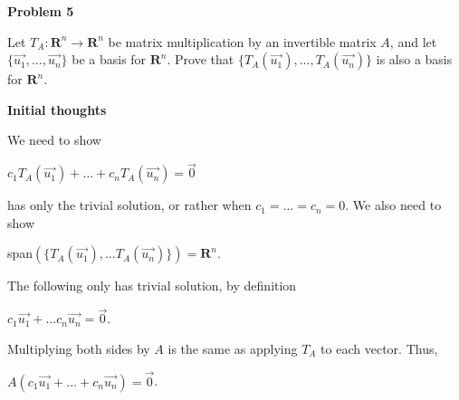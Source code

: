 \documentclass[12pt, a4paper]{article}
\begin{document}
\justifying

\textbf{Problem 5}\par

\vspace{4mm}

    Let $T_A\colon\mathbf{R}^n\rightarrow\mathbf{R}^n$ be matrix multiplication by an invertible matrix $A$, and let $\{\Vec{u_1}, ..., \Vec{u_n}\}$ be a basis for $\mathbf{R}^n$. Prove that $\{T_A(\Vec{u_1}), ..., T_A(\Vec{u_n})\}$ is also a basis for $\mathbf{R}^n$.
    
\vspace{4mm}

\textbf{Initial thoughts}\par

\vspace{4mm}

    We need to show\par
    
\vspace{4mm}
    
    \centerline{$c_1T_A(\Vec{u_1})+\dots+c_nT_A(\Vec{u_n})=\Vec{0}$}
    
\vspace{4mm}

has only the trivial solution, or rather when $c_1=\dots =c_n=0$. We also need to show\par

\vspace{4mm}

\centerline{span$(\{T_A(\Vec{u_1}),\dots T_A(\Vec{u_n})\})=\mathbf{R}^n$.}

\vspace{4mm}

The following only has trivial solution, by definition\par
    
\vspace{4mm}
    
    \centerline{$c_1\Vec{u_1}+\ldots c_n\Vec{u_n}=\Vec{0}$.}
    
\vspace{4mm}

Multiplying both sides by $A$ is the same as applying $T_A$ to each vector. Thus, \par

\vspace{4mm}

\centerline{$A(c_1\Vec{u_1}+\dots+c_n\Vec{u_n})=\Vec{0}$.}

\vspace{4mm}
\end{document}
